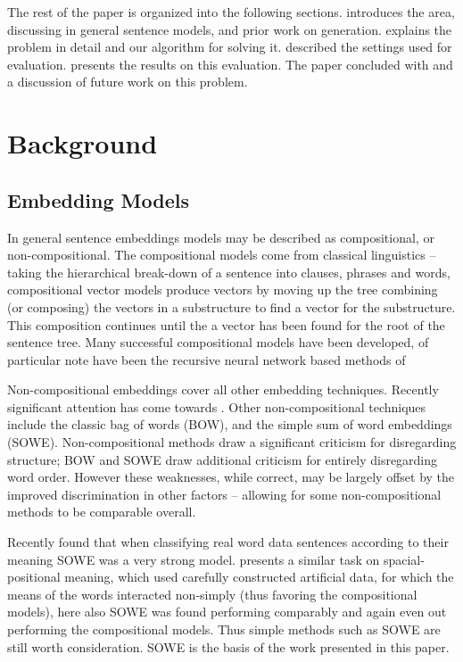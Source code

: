 \documentclass[11pt]{article}
\numberwithin{equation}{section}
\numberwithin{figure}{section}
\theoremstyle{plain}
\theoremstyle{definition}
\begin{document}
The rest of the paper is organized into the following sections.  introduces the area, discussing in general sentence models, and prior work on generation.  explains the problem in detail and our algorithm for solving it.  described the settings used for evaluation.  presents the results on this evaluation. The paper concluded with  and a discussion of future work on this problem.


\section{Background}\label{relwork}

\subsection{Embedding Models}
In general sentence embeddings models may be described as compositional, or non-compositional.
The compositional models come from classical linguistics -- taking the hierarchical  break-down of a sentence into clauses, phrases and words, compositional vector models produce vectors by moving up the tree combining (or composing) the vectors in a substructure to find a vector for the substructure. This composition continues until the a vector has been found for the root of the sentence tree. Many successful compositional models have been developed, of particular note have been the recursive neural network based methods of  \textcite{socher2010PhraseEmbedding}%

Non-compositional embeddings cover all other embedding techniques. Recently significant attention has come towards  \textcite{le2014distributed}. Other non-compositional techniques include the classic bag of words (BOW), and the simple sum of word embeddings (SOWE). Non-compositional methods draw a significant criticism for disregarding structure; BOW and SOWE draw additional criticism for entirely disregarding word order. However these weaknesses, while correct, may be largely offset by the improved discrimination in other factors -- allowing for some non-compositional methods to be comparable overall. 


Recently \textcite{White2015SentVecMeaning} found that when classifying real word data sentences according to their meaning SOWE was a very strong model. \textcite{RitterPosition} presents a similar task on spacial-positional meaning, which used carefully constructed artificial data, for which the means of the words interacted non-simply (thus favoring the compositional models), here also SOWE was found performing comparably and again even out performing the compositional models. Thus simple methods such as SOWE are still worth consideration. SOWE is the basis of the work presented in this paper.
\end{document}
